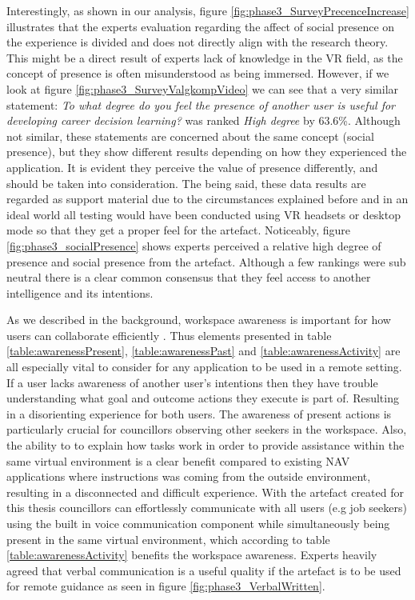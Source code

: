 Interestingly, as shown in our analysis, figure \ref{fig:phase3_SurveyPrecenceIncrease} illustrates that the experts evaluation regarding the affect of social presence on the experience is divided and does not directly align with the research theory. This might be a direct result of experts lack of knowledge in the VR field, as the concept of presence is often misunderstood as being immersed. However, if we look at figure \ref{fig:phase3_SurveyValgkompVideo} we can see that a very similar statement: \textit{To what degree do you feel the presence of another user is useful for developing career decision learning?} was ranked \textit{High degree} by 63.6\%. Although not similar, these statements are concerned about the same concept (social presence), but they show different results depending on how they experienced the application. It is evident they perceive the value of presence differently, and should be taken into consideration. The being said, these data results are regarded as support material due to the circumstances explained before and in an ideal world all testing would have been conducted using VR headsets or desktop mode so that they get a proper feel for the artefact. 
Noticeably,  figure \ref{fig:phase3_socialPresence} shows experts perceived a relative high degree of presence and social presence from the artefact. Although a few rankings were sub neutral there is a clear common consensus that they feel access to another intelligence and its intentions.

As we described in the background, workspace awareness is important for how users can collaborate efficiently \cite{gutwin1996workspace}. Thus elements presented in table \ref{table:awarenessPresent}, \ref{table:awarenessPast}  and \ref{table:awarenessActivity} are all especially vital to consider for any application to be used in a remote setting. If a user lacks awareness of another user's intentions then they have trouble understanding what goal and outcome actions they execute is part of. Resulting in a disorienting experience for both users. The awareness of present actions is particularly crucial for councillors observing other seekers in the workspace. Also, the ability to to explain how tasks work in order to provide assistance within the same virtual environment is a clear benefit compared to existing NAV applications where instructions was coming from the outside environment, resulting in a disconnected and difficult experience. With the artefact created for this thesis councillors can effortlessly communicate with all users (e.g job seekers) using the built in voice communication component while simultaneously being present in the same virtual environment, which according to table \ref{table:awarenessActivity} benefits the workspace awareness. Experts heavily agreed that verbal communication is a useful quality if the artefact is to be used for remote guidance as seen in figure \ref{fig:phase3_VerbalWritten}.         



